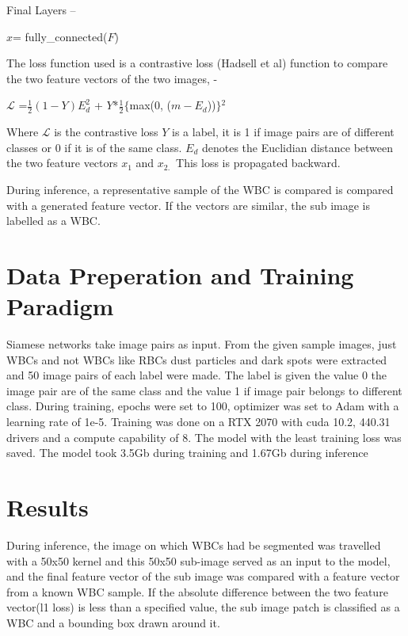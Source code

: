 \documentclass[]{article}
\begin{document}
Final Layers --

\bigskip
\begin{center}
$x$= fully\_connected($F$)
\end{center}
\bigskip

The loss function used is a contrastive loss (Hadsell et al) function to compare the two feature vectors of the two images, - 
\bigskip

\begin{center}
$\mathcal{L}$ =$\frac{1}{2}(1-Y)E^2_d$ + $Y$*$\frac{1}{2}$$\mathrm{\{}$max(0, ($m-E_d$))$\mathrm{\}}$${}^{2}$
\end{center}
\bigskip
Where $\mathcal{L}$ is the contrastive loss  $Y$ is a label, it is 1 if image pairs are of different classes or 0 if it is of the same class. $E_d$ denotes the Euclidian distance between the two feature vectors $x$${}_{1}$ and $x$${}_{2.\ }$ This loss is propagated backward.

During inference, a representative sample of the WBC is compared is compared with a generated feature vector. If the vectors are similar, the sub image is labelled as a WBC.


\section{Data Preperation and Training Paradigm}
Siamese networks take image pairs as input. From the given sample images, just WBCs and not WBCs like RBCs dust particles and dark spots were extracted and 50 image pairs of each label were made. The label is given the value 0 the image pair are of the same class and the value 1 if image pair belongs to different class. During training, epochs were set to 100, optimizer was set to Adam with a learning rate of 1e-5. Training was done on a RTX 2070 with cuda 10.2, 440.31 drivers and a compute capability of 8. The model with the least training loss was saved. The model took 3.5Gb during training and 1.67Gb during inference

\section{Results}
During inference, the image on which WBCs had be segmented was travelled with a 50x50 kernel and this 50x50 sub-image served as an input to the model, and the final feature vector of the sub image was compared with a feature vector from a known WBC sample. If the absolute difference between the two feature vector(l1 loss) is less than a specified value, the sub image patch is classified as a WBC and a bounding box drawn around it. 
\end{document}
